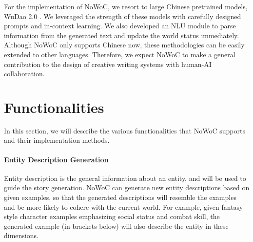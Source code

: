 \documentclass{article}
\newcommand{\KZ}[1]{\textcolor{blue}{Kenny: #1}}
\begin{document}
For the implementation of NoWoC, we resort to large Chinese pretrained models, WuDao 2.0 \cite{dai2019transformer,yuan2021wudaocorpora,ding2021cogview}. We leveraged the strength of these models with carefully designed prompts and in-context learning. We also developed an NLU module to parse information from the generated text and update the world status immediately. Although NoWoC only supports Chinese now, these methodologies can be easily extended to other languages. Therefore, we expect NoWoC to make a general contribution to the design of creative writing systems with human-AI collaboration. 

\section{Functionalities}

In this section, we will describe the various functionalities that NoWoC supports and their implementation methods.



\paragraph{Entity Description Generation} Entity description is the general information about an entity, and will be used to guide the story generation. NoWoC can generate new entity descriptions based on given examples, so that the generated descriptions will resemble the examples and be more likely to cohere with the current world. For example, given fantasy-style character examples emphasizing social status and combat skill, the generated example (in brackets below) will also describe the entity in 
these dimensions. 
\end{document}
